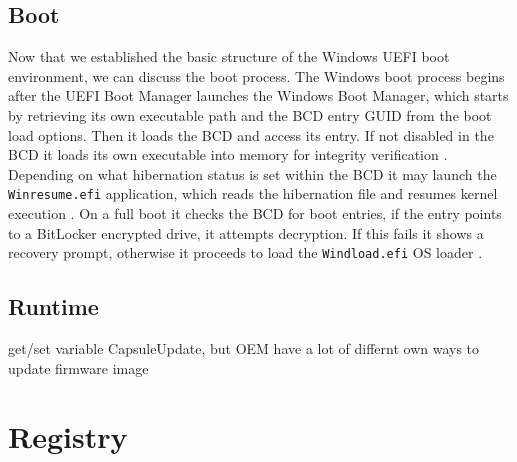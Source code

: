 \subsection{Boot}

Now that we established the basic structure of the Windows UEFI boot environment, we can discuss the boot process.
The Windows boot process begins after the UEFI Boot Manager launches the Windows Boot Manager, which starts by retrieving its own executable path and the \ac{BCD} entry GUID from the boot load options.
Then it loads the \ac{BCD} and access its entry.
If not disabled in the \ac{BCD} it loads its own executable into memory for integrity verification \cite[12. The Windows Boot Manager]{windows-internals-7-part2}.
Depending on what hibernation status is set within the \ac{BCD} it may launch the \lstinline{Winresume.efi} application, which reads the hibernation file and resumes kernel execution \cite[12. Launching a boot application]{windows-internals-7-part2}.
On a full boot it checks the \ac{BCD} for boot entries, if the entry points to a BitLocker encrypted drive, it attempts decryption.
If this fails it shows a recovery prompt, otherwise it proceeds to load the \lstinline{Windload.efi} \ac{OS} loader \cite[12. Launching a boot application]{windows-internals-7-part2}.

\cite[12. Launching a boot application]{windows-internals-7-part2}

\subsection{Runtime}

get/set variable
CapsuleUpdate, but OEM have a lot of differnt own ways to update firmware image

\section{Registry}


